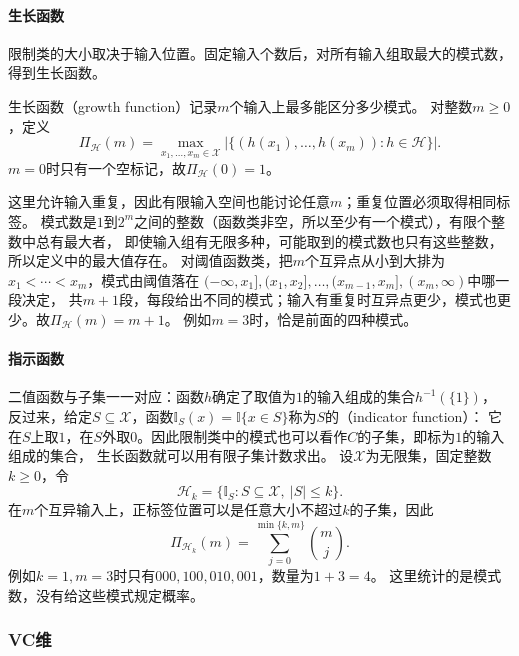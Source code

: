 \paragraph{生长函数}

限制类的大小取决于输入位置。固定输入个数后，对所有输入组取最大的模式数，得到生长函数。
\begin{definition}[生长函数]
  \label{def:growth-function}
  生长函数（growth function）记录$m$个输入上最多能区分多少模式。
  对整数\(m\geq0\)，定义
  \begin{equation}
    \Pi_{\mathcal H}(m)
    =\max_{x_1,\ldots,x_m\in\mathcal X}
    |\{(h(x_1),\ldots,h(x_m)):h\in\mathcal H\}|.
    \label{eq:growth-function}
  \end{equation}
  \(m=0\)时只有一个空标记，故\(\Pi_{\mathcal H}(0)=1\)。
\end{definition}

这里允许输入重复，因此有限输入空间也能讨论任意$m$；重复位置必须取得相同标签。
模式数是$1$到$2^m$之间的整数（函数类非空，所以至少有一个模式），有限个整数中总有最大者，
即使输入组有无限多种，可能取到的模式数也只有这些整数，所以定义中的最大值存在。
对阈值函数类，把$m$个互异点从小到大排为$x_1<\cdots<x_m$，模式由阈值落在
$(-\infty,x_1],(x_1,x_2],\ldots,(x_{m-1},x_m],(x_m,\infty)$中哪一段决定，
共$m+1$段，每段给出不同的模式；输入有重复时互异点更少，模式也更少。故$\Pi_{\mathcal H}(m)=m+1$。
例如$m=3$时，恰是前面的四种模式。

\paragraph{指示函数}

二值函数与子集一一对应：函数$h$确定了取值为$1$的输入组成的集合$h^{-1}(\{1\})$，
反过来，给定$S\subseteq\mathcal X$，函数$\mathbb I_S(x)=\mathbb I\{x\in S\}$称为$S$的（indicator function）：
它在$S$上取$1$，在$S$外取$0$。因此限制类中的模式也可以看作$C$的子集，即标为$1$的输入组成的集合，
生长函数就可以用有限子集计数求出。
设$\mathcal X$为无限集，固定整数$k\geq0$，令
\[
 \mathcal H_k=\{\mathbb I_S:S\subseteq\mathcal X,\ |S|\leq k\}.
\]
在$m$个互异输入上，正标签位置可以是任意大小不超过$k$的子集，因此
\[
 \Pi_{\mathcal H_k}(m)=\sum_{j=0}^{\min\{k,m\}}\binom mj.
\]
例如$k=1,m=3$时只有$000,100,010,001$，数量为$1+3=4$。
这里统计的是模式数，没有给这些模式规定概率。

\subsubsection{VC维}
\label{sec:comb-binary-shattering-counts}

